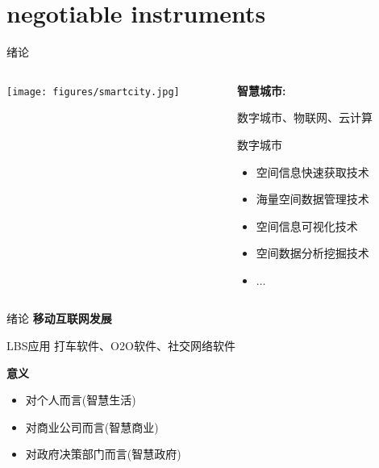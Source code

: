 \section{negotiable instruments}

\begin{frame}{绪论}
    \begin{columns}
        \begin{column}{0.5\textwidth}
        \texttt{[image: figures/smartcity.jpg]}
        \end{column}

        \begin{column}{0.5\textwidth}
        \textbf{智慧城市:} 
        
        数字城市、物联网、云计算
        \vspace{2em}

        \pause
        \alert{数字城市}
        \begin{itemize}
        \item 空间信息快速获取技术
        \item 海量空间数据管理技术
        \item 空间信息可视化技术
        \item 空间数据分析挖掘技术
        \item $\ldots$
        \end{itemize}
        \end{column}
   \end{columns}
\end{frame}

\begin{frame}{绪论}
    \textbf{移动互联网发展}

    \alert{LBS应用}
    打车软件、O2O软件、社交网络软件

    \vspace{2em}
    \pause
    \textbf{意义}
    \begin{itemize}
        \pause
        \item 对个人而言(智慧生活)
        \pause
        \item 对商业公司而言(智慧商业)
        \pause
        \item 对政府决策部门而言(智慧政府)
    \end{itemize}
\end{frame}

